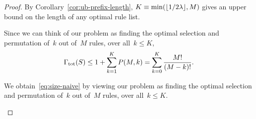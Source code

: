 \begin{proof}
By Corollary~\ref{cor:ub-prefix-length},
${K \equiv \min(\lfloor 1 / 2 {\lambda} \rfloor, M)}$
gives an upper bound on the length of any optimal rule list.
%
\begin{arxiv}
Since we can think of our problem as finding the optimal
selection and permutation of~$k$ out of~$M$ rules,
over all~${k \le K}$,
\begin{align}
{\Gamma_{\textnormal{tot}}}(S) \le 1 + \sum_{k=1}^K P(M, k)
= \sum_{k=0}^K \frac{M!}{(M - k)!}.
\end{align}
\end{arxiv}
\begin{kdd}
We obtain~\eqref{eq:size-naive} by viewing
our problem as finding the optimal
selection and permutation of~$k$ out of~$M$ rules,
over all~${k \le K}$.
\end{kdd}
\end{proof}

